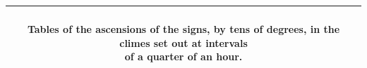 \documentclass[11pt]{article}
\renewcommand{\arraystretch}{1.18}
\begin{document}
\begin{center}\setlength{\tabcolsep}{2.5pt}\renewcommand{\arraystretch}{1.0}\begin{tabular}{||c|c|>{\centering\arraybackslash}p{20mm}|>{\centering\arraybackslash}p{20mm}|>{\centering\arraybackslash}p{20mm}|>{\centering\arraybackslash}p{20mm}|>{\centering\arraybackslash}p{20mm}|>{\centering\arraybackslash}p{20mm}|>{\centering\arraybackslash}p{20mm}||}\hline
\multicolumn{9}{||c||}{\parbox{175mm}{\centering{}\\\textbf{Tables of the ascensions of the signs, by tens of degrees, in the climes set out at intervals}\\\textbf{of a quarter of an hour.}\vspace{1mm}}} \\ \hline

\end{tabular}
\end{center}
\end{document}
